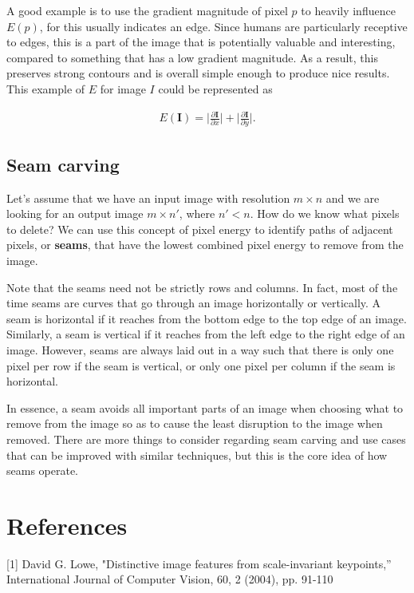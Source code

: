 \documentclass{article}
\begin{document}
A good example is to use the gradient magnitude of pixel $p$ to heavily influence $E(p)$, for this usually indicates an edge. Since humans are particularly receptive to edges, this is a part of the image that is potentially valuable and interesting, compared to something that has a low gradient magnitude. As a result, this preserves strong contours and is overall simple enough to produce nice results. This example of $E$ for image $I$ could be represented as

\begin{align}
	E(\textbf{I}) = \bigg| \frac{\partial \textbf{I}}{\partial x} \bigg| + \bigg| \frac{\partial \textbf{I}}{\partial y} \bigg| \text{.} \nonumber
\end{align}

\subsection{Seam carving}

Let's assume that we have an input image with resolution $m \times n$ and we are looking for an output image $m \times n'$, where $n' < n$. How do we know what pixels to delete? We can use this concept of pixel energy to identify paths of adjacent pixels, or \textbf{seams}, that have the lowest combined pixel energy to remove from the image.

Note that the seams need not be strictly rows and columns. In fact, most of the time seams are curves that go through an image horizontally or vertically. A seam is horizontal if it reaches from the bottom edge to the top edge of an image. Similarly, a seam is vertical if it reaches from the left edge to the right edge of an image. However, seams are always laid out in a way such that there is only one pixel per row if the seam is vertical, or only one pixel per column if the seam is horizontal.

In essence, a seam avoids all important parts of an image when choosing what to remove from the image so as to cause the least disruption to the image when removed. There are more things to consider regarding seam carving and use cases that can be improved with similar techniques, but this is the core idea of how seams operate.

\section*{References}
[1] David G. Lowe, "Distinctive image features from scale-invariant keypoints,”  International Journal of Computer Vision, 60, 2 (2004), pp. 91-110
\end{document}

